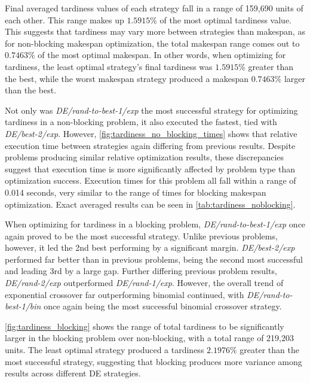 \documentclass{article}
\begin{document}
Final averaged tardiness values of each strategy fall in a range of 159,690 units of each other. This range makes up $1.5915\%$ of the most optimal tardiness value. This suggests that tardiness may vary more between strategies than makespan, as for non-blocking makespan optimization, the total makespan range comes out to $0.7463\%$ of the most optimal makespan. In other words, when optimizing for tardiness, the least optimal strategy's final tardiness was $1.5915\%$ greater than the best, while the worst makespan strategy produced a makespan $0.7463\%$ larger than the best.




Not only was \textit{DE/rand-to-best-1/exp} the most successful strategy for optimizing tardiness in a non-blocking problem, it also executed the fastest, tied with \textit{DE/best-2/exp}. However, \cref{fig:tardiness_no_blocking_times} shows that relative execution time between strategies again differing from previous results. Despite problems producing similar relative optimization results, these discrepancies suggest that execution time is more significantly affected by problem type than optimization success. Execution times for this problem all fall within a range of 0.014 seconds, very similar to the range of times for blocking makespan optimization. Exact averaged results can be seen in \cref{tab:tardiness_noblocking}.





When optimizing for tardiness in a blocking problem, \textit{DE/rand-to-best-1/exp} once again proved to be the most successful strategy. Unlike previous problems, however, it led the 2nd best performing by a significant margin. \textit{DE/best-2/exp} performed far better than in previous problems, being the second most successful and leading 3rd by a large gap. Further differing previous problem results, \textit{DE/rand-2/exp} outperformed \textit{DE/rand-1/exp}. However, the overall trend of exponential crossover far outperforming binomial continued, with \textit{DE/rand-to-best-1/bin} once again being the most successful binomial crossover strategy.

\cref{fig:tardiness_blocking} shows the range of total tardiness to be significantly larger in the blocking problem over non-blocking, with a total range of 219,203 units. The least optimal strategy produced a tardiness $2.1976\%$ greater than the most successful strategy, suggesting that blocking produces more variance among results across different DE strategies. 
\end{document}
